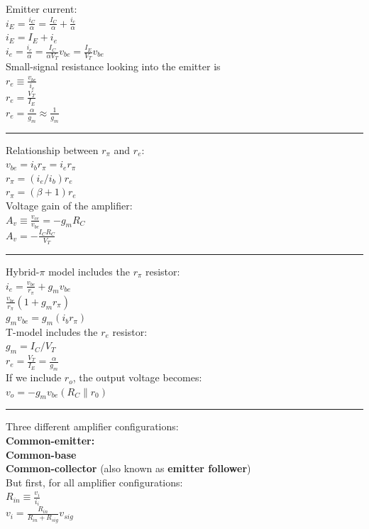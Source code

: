 \documentclass[a4paper]{article}
\newcommand{\hrl}{
    \vspace{2mm}
    \hrule
    \vspace{2mm}
}
\begin{document}
\begin{multicols}{3}
Emitter current:\\
$i_E=\frac{i_C}{\alpha}=\frac{I_C}{\alpha}+\frac{i_c}{\alpha}$\\
$i_E=I_E+i_e$\\
$i_e=\frac{i_c}{\alpha}=\frac{I_C}{\alpha V_T}v_{be}=\frac{I_E}{V_T}v_{be}$\\
Small-signal resistance looking into the emitter is \\
$r_e\equiv \frac{v_{be}}{i_e}$\\
$r_e=\frac{V_T}{I_E}$\\
$r_e=\frac{\alpha}{g_m}\approx\frac{1}{g_m}$\\

\hrl

Relationship between $r_\pi$ and $r_e$:\\
$v_{be}=i_b r_\pi=i_e r_\pi$\\
$r_\pi=(i_e/i_b)r_e$\\
$r_\pi=(\beta + 1)r_e$\\

Voltage gain of the amplifier:\\
$A_v\equiv\frac{v_{ce}}{v_{be}}=-g_m R_C$\\
$A_v=-\frac{I_C R_C}{V_T}$\\

\hrl

Hybrid-$\pi$ model includes the $r_\pi$ resistor:\\
$i_e=\frac{v_{be}}{r_\pi}+g_m v_{be}$\\
$\frac{v_{be}}{r_\pi}(1+g_m r_\pi)$\\
$g_m v_{be}=g_m (i_b r_\pi)$\\

T-model includes the $r_e$ resistor:\\
$g_m=I_C/V_T$\\
$r_e=\frac{V_T}{I_E}=\frac{\alpha}{g_m}$\\

If we include $r_o$, the output voltage becomes:\\
$v_o=-g_m v_{be}(R_C\parallel r_0)$

\hrl

Three different amplifier configurations:\\
\textbf{Common-emitter:}\\
\textbf{Common-base}\\
\textbf{Common-collector} (also known as \textbf{emitter follower})\\

But first, for all amplifier configurations:\\
$R_{in}\equiv \frac{v_i}{i_i}$\\
$v_i=\frac{R_{in}}{R_{in}+R_{sig}}v_{sig}$\\


\end{multicols}
\end{document}
